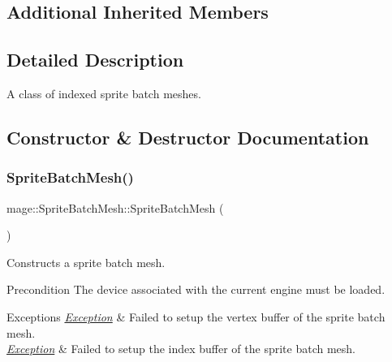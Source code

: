 \subsection*{Additional Inherited Members}


\subsection{Detailed Description}
A class of indexed sprite batch meshes. 

\subsection{Constructor \& Destructor Documentation}
\hypertarget{classmage_1_1_sprite_batch_mesh_ae5b2219aa3d5bbfb216036dad9c12e5d}{}\label{classmage_1_1_sprite_batch_mesh_ae5b2219aa3d5bbfb216036dad9c12e5d} 
\subsubsection{\texorpdfstring{Sprite\+Batch\+Mesh()}{SpriteBatchMesh()}\hspace{0.1cm}{\footnotesize\ttfamily [1/4]}}
{\footnotesize\ttfamily mage\+::\+Sprite\+Batch\+Mesh\+::\+Sprite\+Batch\+Mesh (\begin{DoxyParamCaption}{ }\end{DoxyParamCaption})}

Constructs a sprite batch mesh.

\begin{DoxyPrecond}{Precondition}
The device associated with the current engine must be loaded. 
\end{DoxyPrecond}

\begin{DoxyExceptions}{Exceptions}
{\em \hyperlink{classmage_1_1_exception}{Exception}} & Failed to setup the vertex buffer of the sprite batch mesh. \\
\hline
{\em \hyperlink{classmage_1_1_exception}{Exception}} & Failed to setup the index buffer of the sprite batch mesh. \\
\hline
\end{DoxyExceptions}
\hypertarget{classmage_1_1_sprite_batch_mesh_a3df41f79eb6080be26acceb4d283a913}{}\label{classmage_1_1_sprite_batch_mesh_a3df41f79eb6080be26acceb4d283a913} 
